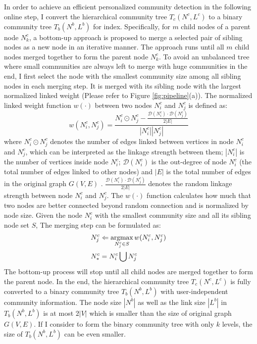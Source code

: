 In order to achieve an efficient personalized community detection in the following online step, I convert the hierarchical community tree \textit{$T_{c}(N^{c},L^{c})$} to a binary community tree \textit{$T_{b}(N^{b},L^{b})$} for index. Specifically, for $m$ child nodes of a parent node $N_{k}^{c}$, a bottom-up approach is proposed to merge a selected pair of sibling nodes as a new node in an iterative manner. The approach runs until all $m$ child nodes merged together to form the parent node $N_{k}^{c}$. To avoid an unbalanced tree where small communities are always left to merge with huge communities in the end, I first select the node with the smallest community size among all sibling nodes in each merging step. It is merged with its sibling node with the largest normalized linked weight (Please refer to Figure \ref{fig:pipeline}(a)). The normalized linked weight function $w(\cdot)$ between  two nodes $N_{i}^{c}$ and $N_{j}^{c}$ is defined as:
\begin{equation} 
\textit{$w(N_{i}^{c},N_{j}^{c})$} =\frac{\textit{$N_{i}^{c}\odot N_{j}^{c}$}-\frac{\mathcal{D}(N_{i}^{c})\cdot \mathcal{D}(N_{j}^{c})}{2|E|} }{\textit{$| N_{i}^{c}||N_{j}^{c}|$}} 
\end{equation} 
where \textit{$N_{i}^{c}\odot N_{j}^{c}$} denotes the number of edges linked between vertices in node \textit{$N_{i}^{c}$} and \textit{$N_{j}^{c}$}, which can be interpreted as the linkage strength between them; \textit{$|N_{i}^{c}|$} is the number of vertices inside node \textit{$N_{i}^{c}$}; \textit{$\mathcal{D}(N_{i}^{c})$} is the out-degree of node \textit{$N_{i}^{c}$} (the total number of edges linked to other nodes) and \textit{$|E|$} is the total number of edges in the original graph $G(V,E)$ . $\frac{\mathcal{D}(N_{i}^{c})\cdot \mathcal{D}(N_{j}^{c})}{2|E|} $ denotes the random linkage strength between node \textit{$N_{i}^{c}$} and \textit{$N_{j}^{c}$}. The \textit{$w(\cdot)$} function calculates how much that two nodes are better connected beyond random connection and is normalized by node size. Given the node $N_{i}^{c}$ with the smallest community size and all its sibling node set $S$, The merging step can be formulated as:
\begin{equation}  
\begin{aligned} 
& N_{j}^{c} \Leftarrow \operatorname*{argmax}_{N_{j}^{c} \in S}w(N_{i}^{c},N_{j}^{c})\\
& N_{*}^{c} = N_{i}^{c}\bigcup N_{j}^{c}
\end{aligned}
\end{equation}
The bottom-up process will stop until all child nodes are merged together to form the parent node. In the end, the hierarchical community tree \textit{$T_{c}(N^{c},L^{c})$} is fully converted to a binary community tree \textit{$T_{b}(N^{b},L^{b})$} with user-independent community information.  The node size $|N^{b}|$ as well as the link size $|L^{b}|$  in \textit{$T_{b}(N^{b},L^{b})$} is at most $2|V|$ which is smaller than the size of original graph $G(V,E)$. If I consider to form the binary community tree with only $k$ levels, the size of \textit{$T_{b}(N^{b},L^{b})$} can be even smaller. 

